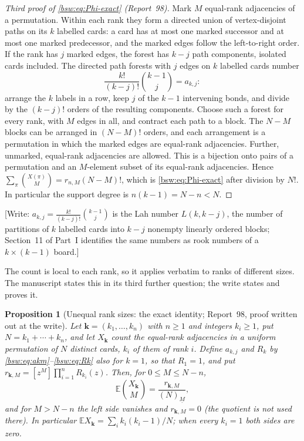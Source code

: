\documentclass[11pt,letterpaper]{article}
\newtheorem{proposition}[theorem]{Proposition}
\theoremstyle{definition}
\theoremstyle{remark}
\newcommand{\EE}{\mathbb E}
\newcommand{\fall}[2]{(#1)_{\underline{#2}}}
\newcommand{\coef}[2]{[#1]#2}
\begin{document}
\begin{proof}[Third proof of \eqref{bsw:eq:Phi-exact} (Report~98)]
Mark $M$ equal-rank adjacencies of a permutation.  Within each
rank they form a directed union of vertex-disjoint paths on its $k$
labelled cards: a card has at most one marked successor and at most one
marked predecessor, and the marked edges follow the left-to-right order.
If the rank has $j$ marked edges, the forest has $k-j$ path components,
isolated cards included.  The directed path forests with $j$ edges on $k$
labelled cards number
\[
 \frac{k!}{(k-j)!}\binom{k-1}{j}=a_{k,j}:
\]
arrange the $k$ labels in a row, keep $j$ of the $k-1$ intervening bonds,
and divide by the $(k-j)!$ orders of the resulting components.  Choose such
a forest for every rank, with $M$ edges in all, and contract each path to a
block.  The $N-M$ blocks can be arranged in $(N-M)!$ orders, and each
arrangement is a permutation in which the marked edges are equal-rank
adjacencies.  Further, unmarked, equal-rank adjacencies are allowed.  This
is a bijection onto pairs of a permutation and an $M$-element subset of its
equal-rank adjacencies.  Hence
$\sum_\pi\binom{X(\pi)}M=r_{n,M}(N-M)!$, which is
\eqref{bsw:eq:Phi-exact} after division by $N!$.  In particular the
support degree is $n(k-1)=N-n<N$.
\end{proof}

[Write: $a_{k,j}=\frac{k!}{(k-j)!}\binom{k-1}j$ is the Lah number
$L(k,k-j)$, the number of partitions of $k$ labelled cards into $k-j$
nonempty linearly ordered blocks; Section~11 of Part~I identifies the same
numbers as rook numbers of a $k\times(k-1)$ board.]

The count is local to each rank, so it applies verbatim to ranks of
different sizes.  The manuscript states this in its third further question;
the write states and proves it.

\begin{proposition}[Unequal rank sizes: the exact identity; Report~98,
proof written out at the write]\label{bsw:ut:prop:unequal-exact}
Let $\mathbf k=(k_1,\ldots,k_n)$ with $n\ge1$ and integers $k_i\ge1$, put
$N=k_1+\cdots+k_n$, and let $X_{\mathbf k}$ count the equal-rank
adjacencies in a uniform permutation of $N$ distinct cards, $k_i$ of them
of rank $i$.  Define $a_{k,j}$ and $R_k$ by
\eqref{bsw:eq:akm}--\eqref{bsw:eq:Rk} also for $k=1$, so that $R_1=1$, and
put $r_{\mathbf k,M}=\coef{z^M}{\prod_{i=1}^nR_{k_i}(z)}$.  Then, for
$0\le M\le N-n$,
\begin{equation}\label{bsw:ut:eq:unequal-exact}
 \EE\binom{X_{\mathbf k}}M=\frac{r_{\mathbf k,M}}{\fall NM},
\end{equation}
and for $M>N-n$ the left side vanishes and $r_{\mathbf k,M}=0$ (the quotient is
not used there).  In particular $\EE X_{\mathbf k}=\sum_ik_i(k_i-1)/N$; when every
$k_i=1$ both sides are zero.
\end{proposition}
\end{document}
